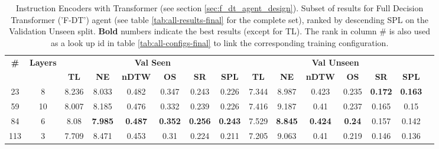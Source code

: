 \begin{table}
\centering
\caption{\label{tab:f_dt_instruction_encoding_full}Instruction Encoders with Transformer (see section \ref{sec:f_dt_agent_design}). Subset of results for Full Decision Transformer ('F-DT') agent (see table \ref{tab:all-results-final} for the complete set), ranked by descending SPL on the Validation Unseen split. \textbf{Bold} numbers indicate the best results (except for TL). The rank in column \# is also used as a look up id in table \ref{tab:all-configs-final} to link the corresponding training configuration.}
\begin{tabular}{@{\hskip3pt}c@{\hskip3pt}c@{\hskip3pt}c@{\hskip3pt}c@{\hskip3pt}c@{\hskip3pt}c@{\hskip3pt}c@{\hskip3pt}c@{\hskip3pt}c@{\hskip3pt}c@{\hskip3pt}c@{\hskip3pt}c@{\hskip3pt}c@{\hskip3pt}c@{\hskip3pt}c}
\toprule
                                  \textbf{\#} & \textbf{Layers} & \multicolumn{6}{c}{\textbf{Val Seen}} & \multicolumn{6}{c}{\textbf{Val Unseen}} \\
\cmidrule(l){3-8}\cmidrule(l){9-14}\textbf{~} &      \textbf{~} &       \textbf{TL} &     \textbf{NE} &   \textbf{nDTW} &     \textbf{OS} &     \textbf{SR} &    \textbf{SPL} &         \textbf{TL} &     \textbf{NE} &   \textbf{nDTW} &    \textbf{OS} &     \textbf{SR} &    \textbf{SPL} \\
\midrule
                                           23 &               8 &             8.236 &           8.033 &           0.482 &           0.347 &           0.243 &           0.226 &               7.344 &           8.987 &           0.423 &          0.235 &  \textbf{0.172} &  \textbf{0.163} \\
                                           59 &              10 &             8.007 &           8.185 &           0.476 &           0.332 &           0.239 &           0.226 &               7.416 &           9.187 &            0.41 &          0.237 &           0.165 &            0.15 \\
                                           84 &               6 &              8.08 &  \textbf{7.985} &  \textbf{0.487} &  \textbf{0.352} &  \textbf{0.256} &  \textbf{0.243} &               7.529 &  \textbf{8.845} &  \textbf{0.424} &  \textbf{0.24} &           0.157 &           0.142 \\
                                          113 &               3 &             7.709 &           8.471 &           0.453 &            0.31 &           0.224 &           0.211 &               7.205 &           9.063 &            0.41 &          0.219 &           0.146 &           0.136 \\
\bottomrule
\end{tabular}
\end{table}
